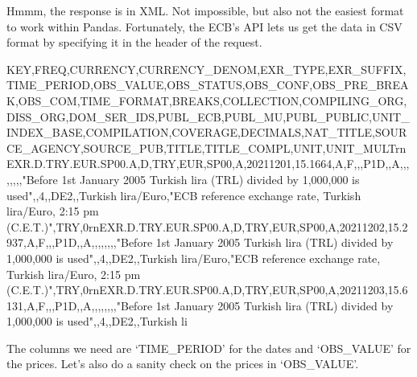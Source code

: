 \documentclass[letterpaper,10pt,english]{sphinxmanual}
\begin{document}
\sphinxAtStartPar
Hmmm, the response is in XML. Not impossible, but also not the easiest
format to work within Pandas. Fortunately, the ECB’s API lets us get the
data in CSV format by specifying it in the header of the request.

\begin{sphinxVerbatim}[commandchars=\\\{\}]
 \PYG{p}{[}\PYG{p}{]}
\end{sphinxVerbatim}
\begin{sphinxalltt}
\textquotesingle{}KEY,FREQ,CURRENCY,CURRENCY\_DENOM,EXR\_TYPE,EXR\_SUFFIX,TIME\_PERIOD,OBS\_VALUE,OBS\_STATUS,OBS\_CONF,OBS\_PRE\_BREAK,OBS\_COM,TIME\_FORMAT,BREAKS,COLLECTION,COMPILING\_ORG,DISS\_ORG,DOM\_SER\_IDS,PUBL\_ECB,PUBL\_MU,PUBL\_PUBLIC,UNIT\_INDEX\_BASE,COMPILATION,COVERAGE,DECIMALS,NAT\_TITLE,SOURCE\_AGENCY,SOURCE\_PUB,TITLE,TITLE\_COMPL,UNIT,UNIT\_MULTrnEXR.D.TRY.EUR.SP00.A,D,TRY,EUR,SP00,A,2021\sphinxhyphen{}12\sphinxhyphen{}01,15.1664,A,F,,,P1D,,A,,,,,,,,"Before 1st January 2005 Turkish lira (TRL) divided by 1,000,000 is used",,4,,DE2,,Turkish lira/Euro,"ECB reference exchange rate, Turkish lira/Euro, 2:15 pm (C.E.T.)",TRY,0rnEXR.D.TRY.EUR.SP00.A,D,TRY,EUR,SP00,A,2021\sphinxhyphen{}12\sphinxhyphen{}02,15.2937,A,F,,,P1D,,A,,,,,,,,"Before 1st January 2005 Turkish lira (TRL) divided by 1,000,000 is used",,4,,DE2,,Turkish lira/Euro,"ECB reference exchange rate, Turkish lira/Euro, 2:15 pm (C.E.T.)",TRY,0rnEXR.D.TRY.EUR.SP00.A,D,TRY,EUR,SP00,A,2021\sphinxhyphen{}12\sphinxhyphen{}03,15.6131,A,F,,,P1D,,A,,,,,,,,"Before 1st January 2005 Turkish lira (TRL) divided by 1,000,000 is used",,4,,DE2,,Turkish li\textquotesingle{}
\end{sphinxalltt}

\sphinxAtStartPar
The columns we need are ‘TIME\_PERIOD’ for the dates and ‘OBS\_VALUE’ for
the prices. Let’s also do a sanity check on the prices in ‘OBS\_VALUE’.

\begin{sphinxVerbatim}[commandchars=\\\{\}]
    
     
       
      
      
      
      
      
   
\end{sphinxVerbatim}
\end{document}
